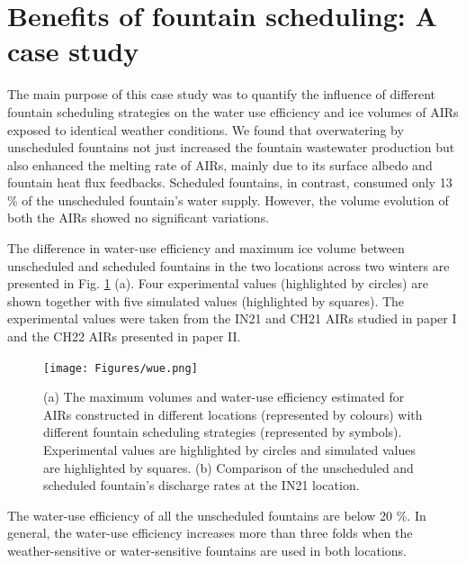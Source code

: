 \section{Benefits of fountain scheduling: A case study}

The main purpose of this case study was to quantify the influence of different fountain scheduling strategies on
the water use efficiency and ice volumes of AIRs exposed to identical weather conditions. We found that
overwatering by unscheduled fountains not just increased the fountain wastewater production but also enhanced
the melting rate of AIRs, mainly due to its surface albedo and fountain heat flux feedbacks. Scheduled
fountains, in contrast, consumed only 13 \% of the unscheduled fountain's water supply. However, the volume
evolution of both the AIRs showed no significant variations. 

The difference in water-use efficiency and maximum ice volume between unscheduled and scheduled fountains in the two
locations across two winters are presented in Fig. \ref{fig:wue} (a). Four experimental values (highlighted by
circles) are shown together with five simulated values (highlighted by squares).  The experimental values were
taken from the IN21 and CH21 AIRs studied in paper I and
the CH22 AIRs presented in paper II. 

\begin{figure}[t]
\texttt{[image: Figures/wue.png]}

\caption{(a) The maximum volumes and water-use efficiency estimated for AIRs constructed in different locations
(represented by colours) with different fountain scheduling strategies (represented by symbols). Experimental
values are highlighted by circles and simulated values are highlighted by squares. (b) Comparison of
the unscheduled and scheduled fountain's discharge rates at the IN21 location.}

\label{fig:wue}
\end{figure}

The water-use efficiency of all the unscheduled fountains are below 20 \%. In general, the water-use efficiency
increases more than three folds when the weather-sensitive or water-sensitive fountains are used in both
locations.  

